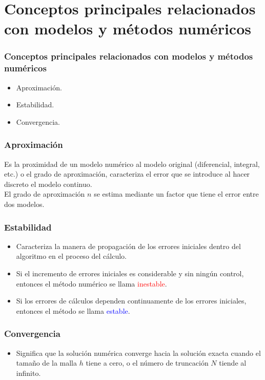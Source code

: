 \section{Conceptos principales relacionados con modelos y métodos numéricos}
\begin{frame}
\frametitle{Conceptos principales relacionados con modelos y métodos numéricos}
\begin{itemize}[<+->]
\item Aproximación.
\item Estabilidad.
\item Convergencia.
\end{itemize}
\end{frame}
\begin{frame}
\frametitle{Aproximación}
Es la proximidad de un modelo numérico al modelo original (diferencial, integral, etc.) o el
grado de aproximación, caracteriza el error que se introduce al hacer discreto el modelo
continuo.
\\
\bigskip
El grado de aproximación $n$ se estima mediante un factor que tiene el error entre dos modelos.
\end{frame}
\begin{frame}
\frametitle{Estabilidad}
\begin{itemize}[<+->]
\item Caracteriza la manera de propagación de los errores iniciales dentro del algoritmo en el
proceso del cálculo.
\item Si el incremento de errores iniciales es considerable y sin ningún control, entonces el
método numérico se llama \textcolor{red}{inestable}.
\item Si los errores de cálculos dependen continuamente de los errores iniciales, entonces el método se llama \textcolor{blue}{estable}.
\end{itemize}
\end{frame}
\begin{frame}
\frametitle{Convergencia}
\begin{itemize}
\item  Significa que la solución numérica converge hacia la solución exacta cuando el tamaño de la malla $h$ tiene a cero, o el número de truncación $N$ tiende al infinito.
\end{itemize}
\end{frame}
